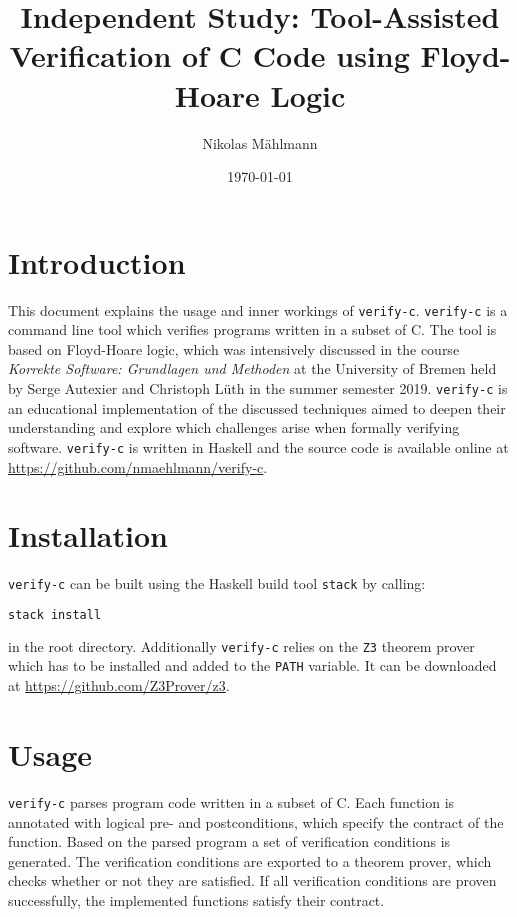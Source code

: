 \documentclass[12pt]{article}
\begin{document}
\setlength{\parindent}{0pt}
\newcommand{\verifyc}[0]{\texttt{verify-c}\xspace}
\newcommand{\zthree}[0]{\texttt{Z3}\xspace}

\title{Independent Study: Tool-Assisted Verification of C Code using Floyd-Hoare Logic}
\author{Nikolas Mählmann}
\date{\today}

\maketitle

\tableofcontents

\section{Introduction}
This document explains the usage and inner workings of \verifyc. 
\verifyc is a command line tool which verifies programs written in a subset of C. 
The tool is based on Floyd-Hoare logic, which was intensively discussed in the course \emph{Korrekte Software: Grundlagen und Methoden} at the University of Bremen held by Serge Autexier and Christoph Lüth in the summer semester 2019. \verifyc is an educational implementation of the discussed techniques aimed to deepen their understanding and explore which challenges arise when formally verifying software. 
\verifyc is written in Haskell and the source code is available online at \url{https://github.com/nmaehlmann/verify-c}.

\section{Installation}
\verifyc can be built using the Haskell build tool \texttt{stack} by calling:

\begin{lstlisting}[language=bash]
stack install
\end{lstlisting}

in the root directory.
Additionally \verifyc relies on the \zthree theorem prover which has to be installed and added to the \texttt{PATH} variable.
It can be downloaded at \url{https://github.com/Z3Prover/z3}.
  

\section{Usage}
\label{usage}
\verifyc parses program code written in a subset of C.
Each function is annotated with logical pre- and postconditions, which specify the contract of the function.
Based on the parsed program a set of verification conditions is generated.
The verification conditions are exported to a theorem prover, which checks whether or not they are satisfied.
If all verification conditions are proven successfully, the implemented functions satisfy their contract.\\
\end{document}
